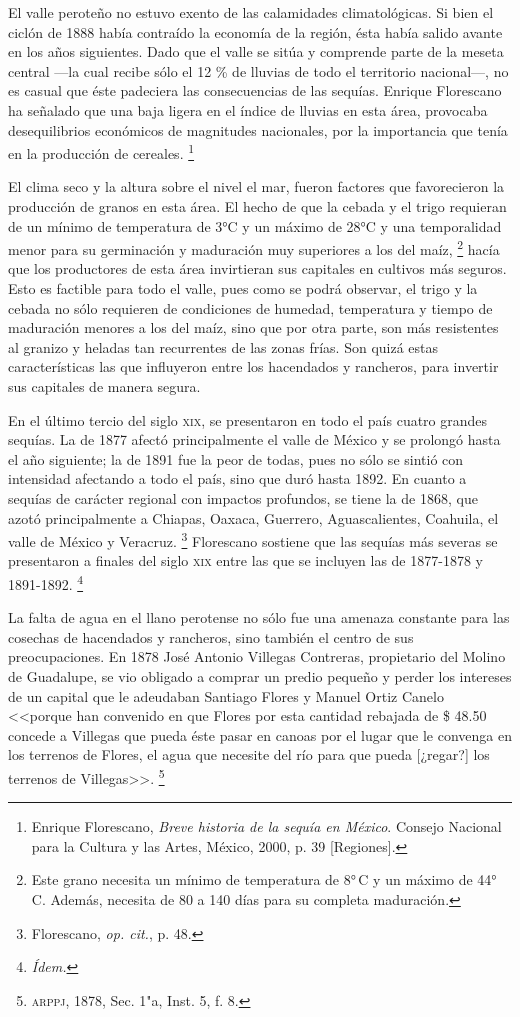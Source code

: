 \documentclass[14pt,twoside,final]{extbook} %
\let\oldfootnote\footnote
\renewcommand\footnote[1]{%
\oldfootnote{\hspace{1mm}#1}}
\begin{document}
El valle peroteño no estuvo exento de las calamidades climatológicas. Si bien el ciclón de 1888 había contraído la economía de la región, ésta había salido avante en los años siguientes. Dado que el valle se sitúa y comprende parte de la meseta central ---la cual recibe sólo el 12 \% de lluvias de todo el territorio nacional---, no es casual que éste padeciera las consecuencias de las sequías. Enrique Florescano ha señalado que una baja ligera en el índice de lluvias en esta área, provocaba desequilibrios económicos de magnitudes nacionales, por la importancia que tenía en la producción de cereales.\footnote{Enrique Florescano, \emph{Breve historia de la sequía en México}. Consejo Nacional para la Cultura y las Artes, México, 2000, p. 39 [Regiones].}

El clima seco y la altura sobre el nivel el mar, fueron factores que favorecieron la producción de granos en esta área. El hecho de que la cebada y el trigo requieran de un mínimo de temperatura de 3°C y un máximo de 28°C y una temporalidad menor para su germinación y maduración muy superiores a los del maíz,\footnote{Este grano necesita un mínimo de temperatura de 8°\,C y un máximo de 44°\,C. Además, necesita de 80 a 140 días para su completa maduración.} hacía que los productores de esta área invirtieran sus capitales en cultivos más seguros. Esto es factible para todo el valle, pues como se podrá observar, el trigo y la cebada no sólo requieren de condiciones de humedad, temperatura y tiempo de maduración menores a los del maíz, sino que por otra parte, son más resistentes al granizo y heladas tan recurrentes de las zonas frías. Son quizá estas características las que influyeron entre los hacendados y rancheros, para invertir sus capitales de manera segura.

En el último tercio del siglo \textsc{xix}, se presentaron en todo el país cuatro grandes sequías. La de 1877 afectó principalmente el valle de México y se prolongó hasta el año siguiente; la de 1891 fue la peor de todas, pues no sólo se sintió con intensidad afectando a todo el país, sino que duró hasta 1892. En cuanto a sequías de carácter regional con impactos profundos, se tiene la de 1868, que azotó principalmente a Chiapas, Oaxaca, Guerrero, Aguascalientes, Coahuila, el valle de México y Veracruz.\footnote{Florescano, \emph{op. cit.}, p. 48.} Florescano sostiene que las sequías más severas se presentaron a finales del siglo \textsc{xix} entre las que se incluyen las de 1877-1878 y 1891-1892.\footnote{\em Ídem.}

La falta de agua en el llano perotense no sólo fue una amenaza constante para las cosechas de hacendados y rancheros, sino también el centro de sus preocupaciones. En 1878 José Antonio Villegas Contreras, propietario del Molino de Guadalupe, se vio obligado a comprar un predio pequeño y perder los intereses de un capital que le adeudaban Santiago Flores y Manuel Ortiz Canelo <<porque han convenido en que Flores por esta cantidad rebajada de \$ 48.50 concede a Villegas que pueda éste pasar en canoas por el lugar que le convenga en los terrenos de Flores, el agua que necesite del río para que pueda [¿regar?] los terrenos de Villegas>>.\footnote{\textsc{arppj}, 1878, Sec. 1"a, Inst. 5, f. 8.}
\end{document}
